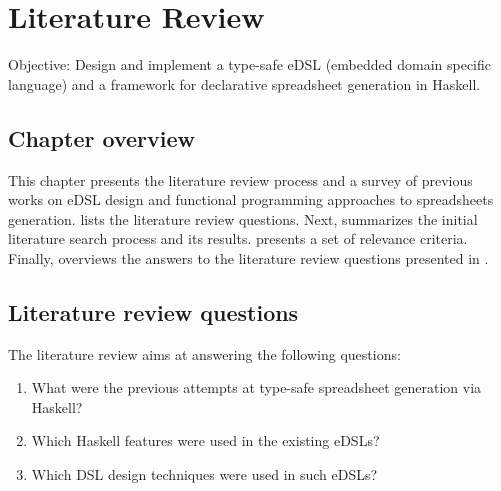 \chapter{Literature Review}
\label{chap:lr}

Objective: Design and implement a type-safe eDSL (embedded domain specific language) and a framework for declarative spreadsheet generation in Haskell.

\section{Chapter overview}
This chapter presents the literature review process and a survey of previous works on eDSL design and functional programming approaches to spreadsheets generation.  lists the literature review questions. Next,  summarizes the initial literature search process and its results.  presents a set of relevance criteria. Finally,  overviews the answers to the literature review questions presented in .

\section{Literature review questions} \label {sec:research_questions}
The literature review aims at answering the following questions:
\begin{enumerate}[noitemsep]
    \item What were the previous attempts at type-safe spreadsheet generation via Haskell?
    \item Which Haskell features were used in the existing eDSLs?
    \item Which DSL design techniques were used in such eDSLs?
\end{enumerate}

